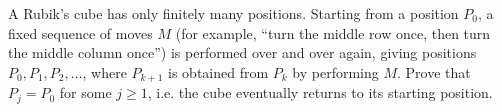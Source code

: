 A Rubik's cube has only finitely many positions. Starting from a position $P_0$, a fixed sequence of moves $M$ (for example, ``turn the middle row once, then turn the middle column once'') is performed over and over again, giving positions $P_0,P_1,P_2,\dots$, where $P_{k+1}$ is obtained from $P_k$ by performing $M$. Prove that $P_j=P_0$ for some $j\ge1$, i.e. the cube eventually returns to its starting position.
